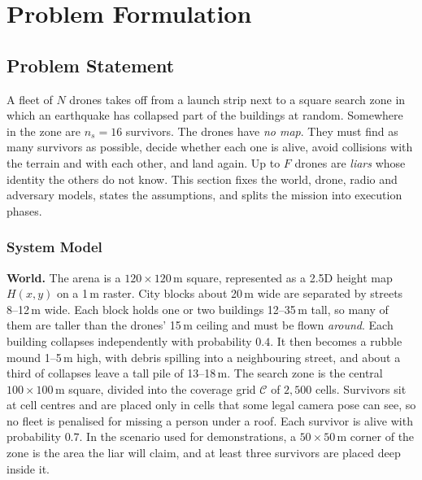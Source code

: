 \chapter[Problem Formulation]{Problem Formulation}
\label{cp:problem}

\parindent0pt

\section{Problem Statement}
\label{sec:problem}

A fleet of $N$ drones takes off from a launch strip next to a square search zone in which an earthquake has collapsed
part of the buildings at random. Somewhere in the zone are $n_s=16$ survivors. The drones have \emph{no map}. They must
find as many survivors as possible, decide whether each one is alive, avoid collisions with the terrain and with each
other, and land again. Up to $F$ drones are \emph{liars} whose identity the others do not know. This section fixes the
world, drone, radio and adversary models, states the assumptions, and splits the mission into execution phases.

\subsection{System Model}
\label{sec:system-model}

\textbf{World.} The arena is a $120\times120$\,m square, represented as a 2.5D height map $H(x,y)$ on a 1\,m raster.
City blocks about 20\,m wide are separated by streets 8--12\,m wide. Each block holds one or two buildings 12--35\,m
tall, so many of them are taller than the drones' 15\,m ceiling and must be flown \emph{around}. Each building collapses
independently with probability $0.4$. It then becomes a rubble mound 1--5\,m high, with debris spilling into a
neighbouring street, and about a third of collapses leave a tall pile of 13--18\,m. The search zone is the central
$100\times100$\,m square, divided into the coverage grid $\mathcal{C}$ of $2{,}500$ cells. Survivors sit at cell centres
and are placed only in cells that some legal camera pose can see, so no fleet is penalised for missing a person under a
roof. Each survivor is alive with probability $0.7$. In the scenario used for demonstrations, a $50\times50$\,m corner
of the zone is the area the liar will claim, and at least three survivors are placed deep inside it.

